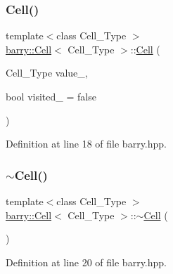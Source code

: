 \mbox{\label{classbarry_1_1_cell_ae315476489673759fad689eb2f8ce952}} 
\subsubsection{\texorpdfstring{Cell()}{Cell()}\hspace{0.1cm}{\footnotesize\ttfamily [2/5]}}
{\footnotesize\ttfamily template$<$class Cell\+\_\+\+Type $>$ \\
\hyperlink{classbarry_1_1_cell}{barry\+::\+Cell}$<$ Cell\+\_\+\+Type $>$\+::\hyperlink{classbarry_1_1_cell}{Cell} (\begin{DoxyParamCaption}\item[{Cell\+\_\+\+Type}]{value\+\_\+,  }\item[{bool}]{visited\+\_\+ = {\ttfamily false} }\end{DoxyParamCaption})\hspace{0.3cm}{\ttfamily [inline]}}



Definition at line 18 of file barry.\+hpp.

\mbox{\label{classbarry_1_1_cell_a2500924b447d4d881916749041974d81}} 
\subsubsection{\texorpdfstring{$\sim$\+Cell()}{~Cell()}}
{\footnotesize\ttfamily template$<$class Cell\+\_\+\+Type $>$ \\
\hyperlink{classbarry_1_1_cell}{barry\+::\+Cell}$<$ Cell\+\_\+\+Type $>$\+::$\sim$\hyperlink{classbarry_1_1_cell}{Cell} (\begin{DoxyParamCaption}{ }\end{DoxyParamCaption})\hspace{0.3cm}{\ttfamily [inline]}}



Definition at line 20 of file barry.\+hpp.

\mbox{\label{classbarry_1_1_cell_af56de393207da4be4cf7e50f7d862613}} 

